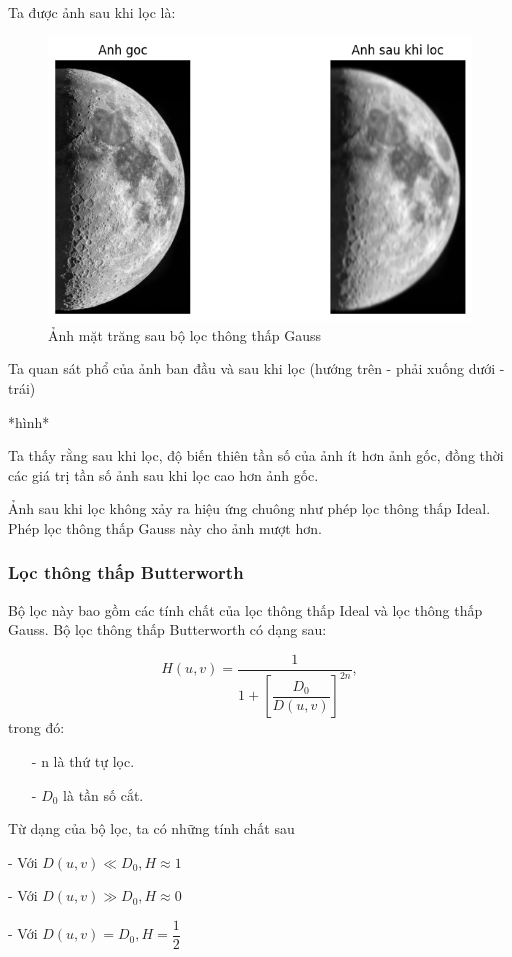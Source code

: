 \documentclass[12pt,a4paper]{report}
\numberwithin{equation}{section}
\theoremstyle{definition} %
\begin{document}
Ta được ảnh sau khi lọc là:
\begin{figure}[H]
\centering
\includegraphics[width=0.8\linewidth]{img/anhsauLocLowpass.png}
\caption{Ảnh mặt trăng sau bộ lọc thông thấp Gauss}
\label{fig118}
\end{figure}
Ta quan sát phổ của ảnh ban đầu và sau khi lọc (hướng trên - phải xuống dưới - trái)

*hình*

Ta thấy rằng sau khi lọc, độ biến thiên tần số của ảnh ít hơn ảnh gốc, đồng thời các giá trị tần số ảnh sau khi lọc cao hơn ảnh gốc.

Ảnh sau khi lọc không xảy ra hiệu ứng chuông như phép lọc thông thấp Ideal. Phép lọc thông thấp Gauss này cho ảnh mượt hơn.
\subsubsection{Lọc thông thấp Butterworth}

Bộ lọc này bao gồm các tính chất của lọc thông thấp Ideal và lọc thông thấp Gauss. Bộ lọc thông thấp Butterworth có dạng sau:

\[H(u,v) = \frac{1}{1 + \left[\dfrac{D_0}{D(u,v)}\right]^{2n}},\]
trong đó: 
\begin{enumerate}
	\item[-] n là thứ tự lọc.
	\item[-] $D_0$ là tần số cắt.
\end{enumerate}

Từ dạng của bộ lọc, ta có những tính chất sau

- Với $D(u,v) \ll D_0, H\approx 1$

- Với $D(u,v) \gg D_0, H\approx 0$

- Với $D(u,v) = D_0, H= \dfrac{1}{2}$
\end{document}
